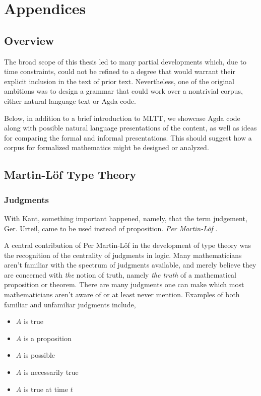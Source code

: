 \section{Appendices} \label{appendix}

\subsection{Overview} 

The broad scope of this thesis led to many partial developments which, due to
time constraints, could not be refined to a degree that would warrant their
explicit inclusion in the text of prior text. Nevertheless, one of the original
ambitions was to design a grammar that could work over a nontrivial corpus,
either natural language text or Agda code.

Below, in addition to a brief introduction to MLTT, we showcase Agda code along
with possible natural language presentations of the content, as well as ideas
for comparing the formal and informal presentations. This should suggest how a
corpus for formalized mathematics might be designed or analyzed.


\subsection{Martin-Löf Type Theory} \label{judge}
\subsubsection{Judgments}

\begin{displayquote}
With Kant, something important happened, namely, that the term judgement, Ger.
Urteil, came to be used instead of proposition. \emph{Per Martin-Löf} \cite{mlMeanings}.
\end{displayquote}

A central contribution of Per Martin-Löf in the development of type theory was
the recognition of the centrality of judgments in logic. Many mathematicians
aren't familiar with the spectrum of judgments available, and merely believe
they are concerned with \emph{the} notion of truth, namely \emph{the truth} of a
mathematical proposition or theorem. There are many judgments one can make which
most mathematicians aren't aware of or at least never mention. Examples of both familiar
and unfamiliar judgments include,

\begin{itemize}

\item $A$ is true
\item $A$ is a proposition
\item $A$ is possible
\item $A$ is necessarily true
\item $A$ is true at time $t$

\end{itemize}

